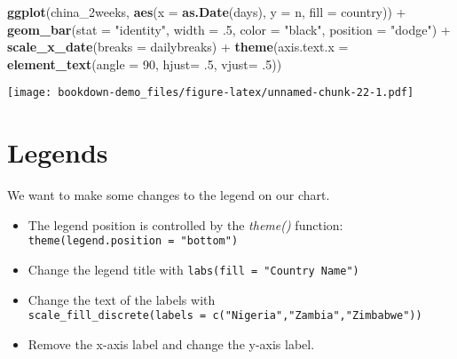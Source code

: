 \documentclass[]{book}
\newenvironment{Shaded}{\begin{snugshade}}{\end{snugshade}}
\newcommand{\KeywordTok}[1]{\textcolor[rgb]{0.13,0.29,0.53}{\textbf{{#1}}}}
\newcommand{\DataTypeTok}[1]{\textcolor[rgb]{0.13,0.29,0.53}{{#1}}}
\newcommand{\DecValTok}[1]{\textcolor[rgb]{0.00,0.00,0.81}{{#1}}}
\newcommand{\StringTok}[1]{\textcolor[rgb]{0.31,0.60,0.02}{{#1}}}
\newcommand{\NormalTok}[1]{{#1}}
\theoremstyle{definition}
\theoremstyle{definition}
\theoremstyle{remark}
\begin{document}
\begin{Shaded}
\begin{Highlighting}[]
\KeywordTok{ggplot}\NormalTok{(china_2weeks, }\KeywordTok{aes}\NormalTok{(}\DataTypeTok{x =} \KeywordTok{as.Date}\NormalTok{(days), }\DataTypeTok{y =} \NormalTok{n, }\DataTypeTok{fill =} \NormalTok{country)) +}
\StringTok{  }\KeywordTok{geom_bar}\NormalTok{(}\DataTypeTok{stat =} \StringTok{"identity"}\NormalTok{, }\DataTypeTok{width =} \NormalTok{.}\DecValTok{5}\NormalTok{, }\DataTypeTok{color =} \StringTok{"black"}\NormalTok{, }\DataTypeTok{position =} \StringTok{"dodge"}\NormalTok{) +}
\StringTok{  }\KeywordTok{scale_x_date}\NormalTok{(}\DataTypeTok{breaks =} \NormalTok{dailybreaks) +}
\StringTok{  }\KeywordTok{theme}\NormalTok{(}\DataTypeTok{axis.text.x =} \KeywordTok{element_text}\NormalTok{(}\DataTypeTok{angle =} \DecValTok{90}\NormalTok{, }\DataTypeTok{hjust=} \NormalTok{.}\DecValTok{5}\NormalTok{, }\DataTypeTok{vjust=} \NormalTok{.}\DecValTok{5}\NormalTok{))}
\end{Highlighting}
\end{Shaded}

\texttt{[image: bookdown-demo\_files/figure-latex/unnamed-chunk-22-1.pdf]}

\section{Legends}\label{legends}

We want to make some changes to the legend on our chart.

\begin{itemize}
\item
  The legend position is controlled by the \emph{theme()} function:
  \texttt{theme(legend.position\ =\ "bottom")}
\item
  Change the legend title with \texttt{labs(fill\ =\ "Country\ Name")}
\item
  Change the text of the labels with
  \texttt{scale\_fill\_discrete(labels\ =\ c("Nigeria","Zambia","Zimbabwe"))}
\item
  Remove the x-axis label and change the y-axis label.
\end{itemize}
\end{document}
